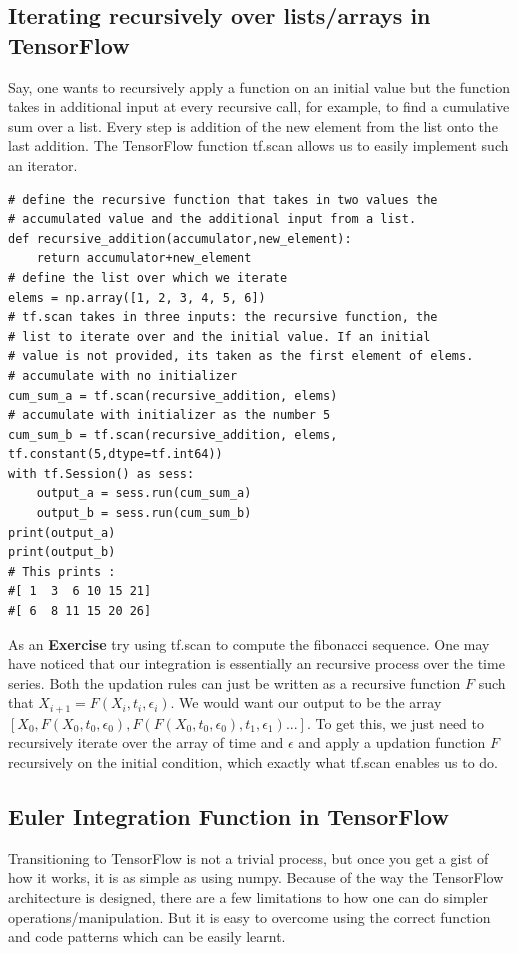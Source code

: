 \documentclass[10pt,letterpaper]{article}
\begin{document}
\subsection*{Iterating recursively over lists/arrays in TensorFlow}

Say, one wants to recursively apply a function on an initial value but the function takes in additional input at every recursive call, for example, to find a cumulative sum over a list. Every step is addition of the new element from the list onto the last addition. The TensorFlow function tf.scan allows us to easily implement such an iterator.

\begin{verbatim}
# define the recursive function that takes in two values the
# accumulated value and the additional input from a list.
def recursive_addition(accumulator,new_element):
    return accumulator+new_element
# define the list over which we iterate
elems = np.array([1, 2, 3, 4, 5, 6])
# tf.scan takes in three inputs: the recursive function, the 
# list to iterate over and the initial value. If an initial 
# value is not provided, its taken as the first element of elems.
# accumulate with no initializer
cum_sum_a = tf.scan(recursive_addition, elems) 
# accumulate with initializer as the number 5
cum_sum_b = tf.scan(recursive_addition, elems, tf.constant(5,dtype=tf.int64))
with tf.Session() as sess:
    output_a = sess.run(cum_sum_a)
    output_b = sess.run(cum_sum_b)
print(output_a)
print(output_b)
# This prints :
#[ 1  3  6 10 15 21]
#[ 6  8 11 15 20 26]
\end{verbatim}

As an \textbf{Exercise} try using tf.scan to compute the fibonacci sequence. One may have noticed that our integration is essentially an recursive process over the time series. Both the updation rules can just be written as a recursive function $F$ such that $X_{i+1}=F(X_i,t_i,\epsilon_i)$. We would want our output to be the array $[X_0,F(X_0,t_0,\epsilon_0),F(F(X_0,t_0,\epsilon_0),t_1,\epsilon_1)...]$. To get this, we just need to recursively iterate over the array of time and $\epsilon$ and apply a updation function $F$ recursively on the initial condition, which exactly what tf.scan enables us to do.

\subsection*{Euler Integration Function in TensorFlow}

Transitioning to TensorFlow is not a trivial process, but once you get a gist of how it works, it is as simple as using numpy. Because of the way the TensorFlow architecture is designed, there are a few limitations to how one can do simpler operations/manipulation. But it is easy to overcome using the correct function and code patterns which can be easily learnt.
\end{document}
